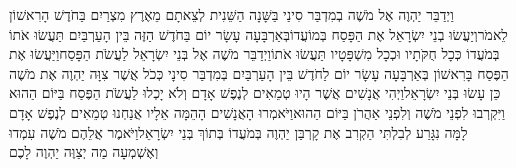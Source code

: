 \documentclass[../main/main.tex]{subfiles}
\begin{document}
\begin{multicols}{\ncols}
וַיְדַבֵּר יַהְוֶה אֶל מֹשֶׁה בְמִדְבַּר סִינַי בַּשָּׁנָה הַשֵּׁנִית לְצֵאתָם מֵאֶרֶץ מִצְרַיִם בַּחֹדֶשׁ הָרִאשׁוֹן לֵאמֹר\PreVerseSpace{}וְיַעֲשׂוּ בְנֵי יִשְׂרָאֵל אֶת הַפָּסַח בְּמוֹעֲדוֹ\PreVerseSpace{}בְּאַרְבָּעָה עָשָׂר יוֹם בַּחֹדֶשׁ הַזֶּה בֵּין הָעַרְבַּיִם תַּעֲשׂוּ אֹתוֹ בְּמֹעֲדוֹ כְּכָל חֻקֹּתָיו וּכְכָל מִשְׁפָּטָיו תַּעֲשׂוּ אֹתוֹ\PreVerseSpace{}וַיְדַבֵּר מֹשֶׁה אֶל בְּנֵי יִשְׂרָאֵל לַעֲשֹׂת הַפָּסַח\PreVerseSpace{}וַיַּעֲשׂוּ אֶת הַפֶּסַח בָּרִאשׁוֹן בְּאַרְבָּעָה עָשָׂר יוֹם לַחֹדֶשׁ בֵּין הָעַרְבַּיִם בְּמִדְבַּר סִינָי כְּכֹל אֲשֶׁר צִוָּה יַהְוֶה אֶת מֹשֶׁה כֵּן עָשׂוּ בְּנֵי יִשְׂרָאֵל\PreVerseSpace{}וַיְהִי אֲנָשִׁים אֲשֶׁר הָיוּ טְמֵאִים לְנֶפֶשׁ אָדָם וְלֹא יָכְלוּ לַעֲשֹׂת הַפֶּסַח בַּיּוֹם הַהוּא וַיִּקְרְבוּ לִפְנֵי מֹשֶׁה וְלִפְנֵי אַהֲרֹן בַּיּוֹם הַהוּא\PreVerseSpace{}וַיֹּאמְרוּ הָאֲנָשִׁים הָהֵמָּה אֵלָיו אֲנַחְנוּ טְמֵאִים לְנֶפֶשׁ אָדָם לָמָּה נִגָּרַע לְבִלְתִּי הַקְרִב אֶת קָרְבַּן יַהְוֶה בְּמֹעֲדוֹ בְּתוֹךְ בְּנֵי יִשְׂרָאֵל\PreVerseSpace{}וַיֹּאמֶר אֲלֵהֶם מֹשֶׁה עִמְדוּ וְאֶשְׁמְעָה מַה יְצַוֶּה יַהְוֶה לָכֶם\OpenSection{}\par

\end{multicols}
\end{document}
